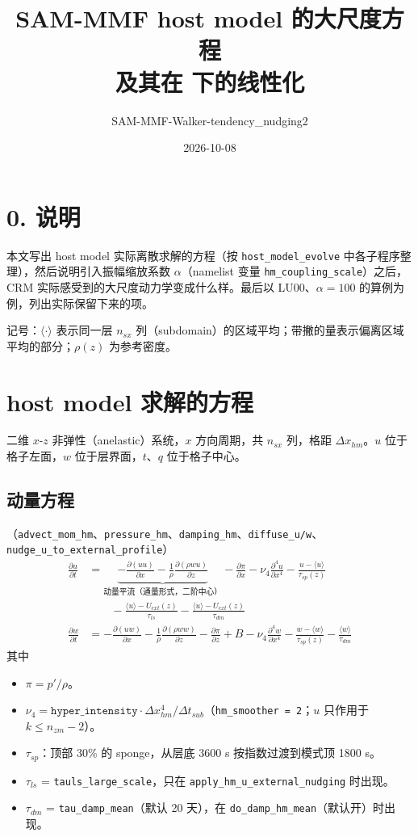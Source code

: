 \documentclass[11pt,a4paper]{article}
\title{SAM-MMF host model 的大尺度方程\\及其在 \code{hm\_coupling\_scale} 下的线性化}
\author{SAM-MMF-Walker-tendency\_nudging2 \quad \code{module\_hostmodel.f90}}
\date{2026-10-08}
\newcommand{\code}[1]{\texttt{#1}}
\newcommand{\avg}[1]{\langle #1\rangle}
\newcommand{\pd}[2]{\frac{\partial #1}{\partial #2}}
\begin{document}
\maketitle

\section*{0. 说明}

本文写出 host model 实际离散求解的方程（按 \code{host\_model\_evolve} 中各子程序整理），然后说明引入振幅缩放系数 $\alpha$（namelist 变量 \code{hm\_coupling\_scale}）之后，CRM 实际感受到的大尺度动力学变成什么样。最后以 LU00、$\alpha=100$ 的算例为例，列出实际保留下来的项。

记号：$\avg{\cdot}$ 表示同一层 $n_{sx}$ 列（subdomain）的区域平均；带撇的量表示偏离区域平均的部分；$\rho(z)$ 为参考密度。

\section{host model 求解的方程}

二维 $x$-$z$ 非弹性（anelastic）系统，$x$ 方向周期，共 $n_{sx}$ 列，格距 $\Delta x_{hm}$。$u$ 位于格子左面，$w$ 位于层界面，$t$、$q$ 位于格子中心。

\subsection{动量方程}

（\code{advect\_mom\_hm}、\code{pressure\_hm}、\code{damping\_hm}、\code{diffuse\_u/w}、\code{nudge\_u\_to\_external\_profile}）
\begin{align}
\pd{u}{t} &= \underbrace{-\pd{(uu)}{x} - \frac{1}{\rho}\pd{(\rho w u)}{z}}_{\text{动量平流（通量形式，二阶中心）}}
 - \pd{\pi}{x}
 - \nu_4 \frac{\partial^4 u}{\partial x^4}
 - \frac{u-\avg{u}}{\tau_{sp}(z)} \nonumber\\
 &\qquad - \frac{\avg{u}-U_{ext}(z)}{\tau_{ls}}
 - \frac{\avg{u}-U_{ext}(z)}{\tau_{dm}} \label{eq:u}\\[4pt]
\pd{w}{t} &= -\pd{(uw)}{x} - \frac{1}{\rho}\pd{(\rho w w)}{z}
 - \pd{\pi}{z} + B
 - \nu_4 \frac{\partial^4 w}{\partial x^4}
 - \frac{w-\avg{w}}{\tau_{sp}(z)}
 - \frac{\avg{w}}{\tau_{dm}} \label{eq:w}
\end{align}
其中
\begin{itemize}[leftmargin=1.5em,itemsep=2pt]
\item $\pi=p'/\rho$。
\item $\nu_4 = \code{hyper\_intensity}\cdot\Delta x_{hm}^4/\Delta t_{sub}$（\code{hm\_smoother = 2}；$u$ 只作用于 $k\le n_{zm}-2$）。
\item $\tau_{sp}$：顶部 30\% 的 sponge，从层底 3600 s 按指数过渡到模式顶 1800 s。
\item $\tau_{ls}$ = \code{tauls\_large\_scale}，只在 \code{apply\_hm\_u\_external\_nudging} 时出现。
\item $\tau_{dm}$ = \code{tau\_damp\_mean}（默认 20 天），在 \code{do\_damp\_hm\_mean}（默认开）时出现。
\end{itemize}
\end{document}
